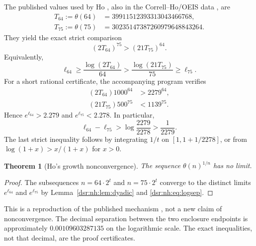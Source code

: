 \documentclass[11pt,a4paper]{article}
\numberwithin{equation}{section}
\newtheorem{theorem}{Theorem}[section]
\theoremstyle{definition}
\theoremstyle{remark}
\newcommand{\tht}{\theta}
\theoremstyle{definition}
\theoremstyle{plain}
\begin{document}
The published values used by Ho \cite{Ho}, also in the Correll--Ho/OEIS
data \cite{CorrellHo,OEIS}, are
\begin{align}
T_{64}:=\tht(64)&=39911512393313043466768,\\
T_{75}:=\tht(75)&=30235147387260979648843264.
\label{dsr:nh:eq:largecounts}
\end{align}
They yield the exact strict comparison
\begin{equation}
(2T_{64})^{75}>(21T_{75})^{64}.
\label{dsr:nh:eq:exactsep}
\end{equation}
Equivalently,
\begin{equation}
\ell_{64}\ge\frac{\log(2T_{64})}{64}
>\frac{\log(21T_{75})}{75}\ge\ell_{75}.
\label{dsr:nh:eq:logsep}
\end{equation}
For a short rational certificate, the accompanying program verifies
\begin{align}
(2T_{64})1000^{64}&>2279^{64},\\
(21T_{75})500^{75}&<1139^{75}.
\end{align}
Hence $e^{\ell_{64}}>2.279$ and $e^{\ell_{75}}<2.278$. In particular,
\begin{equation}
\ell_{64}-\ell_{75}>
\log\frac{2279}{2278}>\frac1{2279}.
\label{dsr:nh:eq:rationalgap}
\end{equation}
The last strict inequality follows by integrating $1/t$ on
$[1,1+1/2278]$, or from $\log(1+x)>x/(1+x)$ for $x>0$.

\begin{theorem}[Ho's growth nonconvergence]
\label{dsr:nh:thm:ho}
The sequence $\tht(n)^{1/n}$ has no limit.
\end{theorem}
\begin{proof}
The subsequences $n=64\cdot2^t$ and $n=75\cdot2^t$ converge to the
distinct limits $e^{\ell_{64}}$ and $e^{\ell_{75}}$ by
Lemma~\ref{dsr:nh:lem:dyadic} and \eqref{dsr:nh:eq:logsep}.
\end{proof}
This is a reproduction of the published mechanism \cite{Ho}, not a new
claim of nonconvergence. The decimal separation between the two enclosure
endpoints is approximately $0.00109603287135$ on the logarithmic scale.
The exact inequalities, not that decimal, are the proof certificates.
\end{document}
